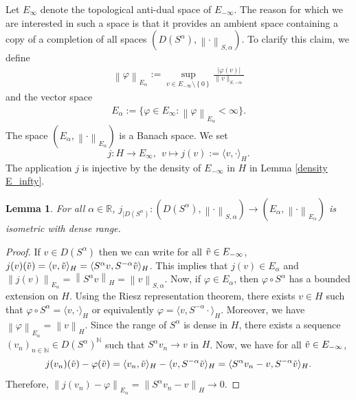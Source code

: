 \documentclass[11pt, letterpaper]{amsart}
\newtheorem{lem}[thm]{Lemma}
\theoremstyle{definition}
\theoremstyle{remark}
\numberwithin{equation}{section}
\begin{document}
Let $E_{\infty}$ denote the topological anti-dual space of $E_{-\infty}$. The reason for which we are interested in such a space is that it provides an ambient space containing a copy of a completion of all spaces $ ( D(S^\alpha), \left\| \cdot \right\|_{S,\alpha})  $. To clarify this claim, we define  \begin{align*}
    \left \| \varphi  \right \|_{E_\alpha} := \sup_{v \in E_{-\infty}\setminus \left \{ 0 \right \}}\frac {| \varphi (v)|}  {   \| v  \|_{S,-\alpha}}
\end{align*} and the vector space
\begin{align*}
    E_{\alpha}:= \{\varphi \in E_\infty :  \left \| \varphi  \right \|_{E_\alpha}<\infty\}. 
\end{align*}
The space $\left ( E_{\alpha},\left \| \cdot \right \|_{E_\alpha} \right )$ is a Banach space. We set
\begin{equation*}
j : H   \rightarrow E_\infty, \ \ v \mapsto j(v):=\langle v ,\cdot \rangle_{ H }.
\end{equation*}
The application $j$ is injective by the density of $E_{-\infty}$ in $H$ in Lemma \ref{density E_infty}. 
\begin{lem}\label{j identification}
  For all $\alpha \in \mathbb{R}$,  $ j_{\scriptscriptstyle{\vert D(S^\alpha)}}:  (D(S^{\alpha}),  \left\| \cdot \right\|_{S,\alpha} )   \rightarrow \left ( E_{\alpha},\left \| \cdot \right \|_{E_\alpha} \right )$ is isometric with dense range.
\end{lem}
\begin{proof}
     If $v \in D(S^\alpha)$ then we can write for all $\Tilde{v} \in E_{-\infty}$,  $j(v)(\Tilde{v})=\langle v, \Tilde{v} \rangle_H = \langle S^\alpha v, S^{-\alpha} \Tilde{v} \rangle_H$. This implies that $j(v) \in E_{\alpha}$ and $\left \| j(v) \right \|_{E_{\alpha }}=\left \| S^\alpha v \right \|_H=\left \| v \right \|_{S,\alpha}$. Now, if $\varphi \in E_\alpha$, then $\varphi \circ S^\alpha$ has a bounded extension on $H$. Using the Riesz representation theorem, there exists $v \in H$ such that $\varphi \circ S^\alpha = \langle v, \cdot \rangle_H$ or equivalently $\varphi = \langle v, S^{-\alpha}\cdot \rangle_H$. Moreover, we have $\left \| \varphi  \right \|_{E_\alpha}= \left \| v  \right \|_H$. Since the range of $S^\alpha$ is dense in $H$,  there exists a sequence $(v_n)_{n \in \mathbb{N}} \in D(S^\alpha)^{\mathbb{N}}$ such that $S^\alpha v_n \to v$ in $H$. Now, we have for all $\Tilde{v}\in E_{-\infty}$,
\begin{align*}
    j(v_n)(\Tilde{v})-\varphi (\Tilde{v})=    \langle v_n, \Tilde{v} \rangle_H -\langle v, S^{-\alpha}\Tilde{v}  \rangle_H  = \langle S^\alpha v_n-v, S^{-\alpha}\Tilde{v} \rangle_H.
\end{align*}
Therefore, $\left \| j(v_n)-\varphi  \right \|_{E_\alpha}=\left \| S^\alpha v_n -v  \right \|_H \to 0$.
\end{proof}
\end{document}
